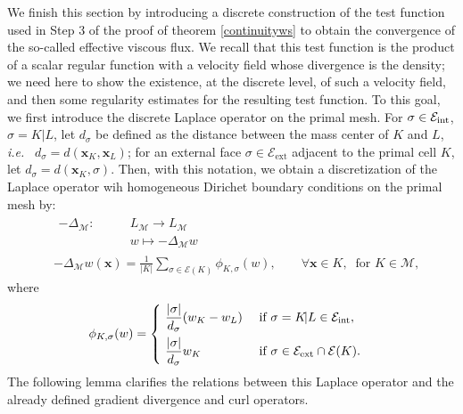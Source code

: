 \documentclass{amsart}
\numberwithin{equation}{section}
\begin{document}
\bigskip
We finish this section by introducing a discrete construction of the test function used in Step 3 of the proof of theorem \ref{continuityws} to obtain the convergence of the so-called effective viscous flux.
We recall that this test function is the product of a scalar regular function with a velocity field whose divergence is the density; we need here to show the existence, at the discrete level, of such a velocity field, and then some regularity estimates for the resulting test function.
To this goal, we first introduce the discrete Laplace operator on the primal mesh.
For ${{\sigma}} \in {{\mathcal E}_{\rm int}}$, ${{\sigma}}=K|L$, let $d_{{\sigma}}$ be defined as the distance between the mass center of $K$ and $L$, {\emph{i.e.\/}} \ $d_{{\sigma}}=d({{\boldsymbol x}}_K,{{\boldsymbol x}}_L)$; for an external face ${{\sigma}} \in {{\mathcal E}_{\mathrm{ext}}}$ adjacent to the primal cell $K$, let $d_{{\sigma}}=d({{\boldsymbol x}}_K,{{\sigma}})$.
Then, with this notation, we obtain a discretization of the Laplace operator wih homogeneous Dirichet boundary conditions on the primal mesh by:
\begin{align}
  &
\begin{array}{l|l}
-\Delta_{{\mathcal M}} : \quad
& \quad
L_{{\mathcal M}}  \longrightarrow  L_{{\mathcal M}}
\\ & \displaystyle \quad
w \longmapsto - \Delta_{{\mathcal M}} w  
\end{array} \nonumber \\
& 
- \Delta_{{\mathcal M}} w ({{\boldsymbol x}})=\frac{ 1}{ \vert K \vert}\sum_{{{\sigma}} \in {{\mathcal E}}(K)} 
\phi_{K,{{\sigma}}}(w),\qquad \forall {{\boldsymbol x}}\in K,\ 
\mbox{ for } K \in {{\mathcal M}}, \label{eq:lap2}
\end{align}
where
\begin{align}
&\displaystyle
\phi_{K,{{\sigma}}}(w)=
\begin{cases}
\ \dfrac{\vert {{\sigma}}\vert}{d_{{\sigma}}} (w_{K}-w_{L}) &\mbox{ if } {{\sigma}}= K \! \vert L
 \in {{\mathcal E}_{\rm int}},\\[2ex]
\ \dfrac{\vert{{\sigma}}\vert}{d_{{\sigma}}} w_{K} &\mbox{ if } {{\sigma}} \in{{\mathcal E}_{\mathrm{ext}}}\cap {{\mathcal E}}(K).
\end{cases}
\end{align}
The following lemma \cite{eymard2010convergence} clarifies the relations between this Laplace operator and the already defined gradient  divergence and curl operators.
\end{document}
